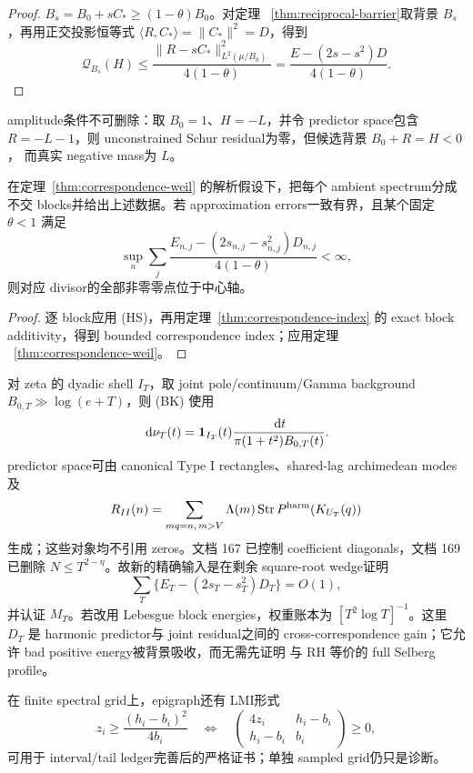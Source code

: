 \begin{proof}
$B_s=B_0+sC_*\geq(1-\theta)B_0$。对定理
~\ref{thm:reciprocal-barrier}取背景 $B_s$，再用正交投影恒等式
$\langle R,C_*\rangle=\|C_*\|^2=D$，得到
\[
 \mathcal Q_{B_s}(H)\leq\frac{\|R-sC_*\|^2_{L^2(\mu/B_0)}}{4(1-\theta)}
 =\frac{E-(2s-s^2)D}{4(1-\theta)}.
\]
\end{proof}

amplitude条件不可删除：取 $B_0=1$、$H=-L$，并令 predictor space包含
$R=-L-1$，则 unconstrained Schur residual为零，但候选背景 $B_0+R=H<0$，
而真实 negative mass为 $L$。

\begin{theorem}
\label{thm:shorted-background-weil}
在定理~\ref{thm:correspondence-weil} 的解析假设下，把每个 ambient spectrum分成
不交 blocks并给出上述数据。若 approximation errors一致有界，且某个固定
$\theta<1$ 满足
\[
 \sup_n\sum_j\frac{E_{n,j}-(2s_{n,j}-s_{n,j}^2)D_{n,j}}
                         {4(1-\theta)}<\infty,   \tag{SW}
\]
则对应 divisor的全部非零零点位于中心轴。
\end{theorem}

\begin{proof}
逐 block应用 (HS)，再用定理~\ref{thm:correspondence-index} 的 exact block
additivity，得到 bounded correspondence index；应用定理
~\ref{thm:correspondence-weil}。
\end{proof}

对 zeta 的 dyadic shell $I_T$，取 joint pole/continuum/Gamma background
$B_{0,T}\gg\log(e+T)$，则 (BK) 使用
\[
 \,\mathrm d\nu_T(t)=\mathbf 1_{I_T}(t)
 \frac{\,\mathrm d t}{\pi(1+t^2)B_{0,T}(t)}.
\]
predictor space可由 canonical Type I rectangles、shared-lag archimedean modes及
\[
 R_{II}(n)=\sum_{mq=n,\,m>V}\Lambda(m)
 \operatorname{Str}P^{\rm harm}(K_{U_T}(q))
\]
生成；这些对象均不引用 zeros。文档 167 已控制 coefficient diagonals，文档 169
已删除 $N\leq T^{2-\eta}$。故新的精确输入是在剩余 square-root wedge证明
\[
 \sum_T\{E_T-(2s_T-s_T^2)D_T\}=O(1),            \tag{ZT}
\]
并认证 $M_T$。若改用 Lebesgue block energies，权重账本为
$[T^2\log T]^{-1}$。这里 $D_T$ 是 harmonic predictor与 joint residual之间的
cross-correspondence gain；它允许 bad positive energy被背景吸收，而无需先证明
与 RH 等价的 full Selberg profile。

在 finite spectral grid上，epigraph还有 LMI形式
\[
 z_i\geq\frac{(h_i-b_i)^2}{4b_i}
 \quad\Longleftrightarrow\quad
 \begin{pmatrix}4z_i&h_i-b_i\\h_i-b_i&b_i\end{pmatrix}\geq0,
\]
可用于 interval/tail ledger完善后的严格证书；单独 sampled grid仍只是诊断。
